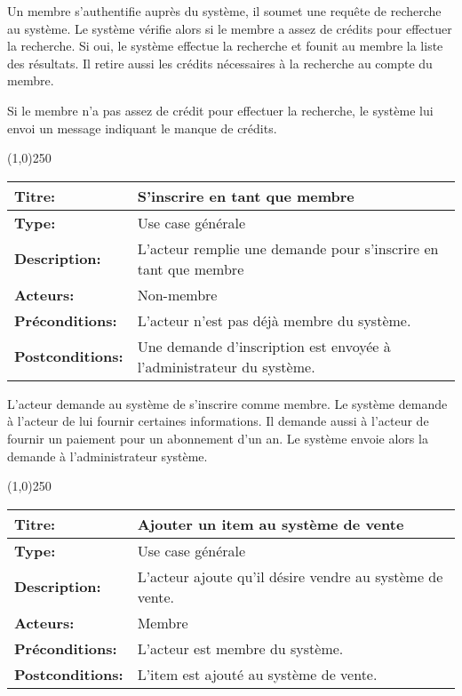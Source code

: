 \documentclass[letterpaper,11pt]{letter}
\begin{document}
Un membre s'authentifie auprès du système, il soumet une requête de recherche au système. Le système vérifie alors si le membre a assez de crédits pour effectuer
la recherche. Si oui, le système effectue la recherche et founit au membre la liste des résultats. Il retire aussi les crédits nécessaires à la recherche au compte
du membre.

Si le membre n'a pas assez de crédit pour effectuer la recherche, le système lui envoi un message indiquant le manque de crédits.

\begin{center}
\line(1,0){250}
\end{center}

\begin{tabular}{|l|p{}|}
  \hline
{\bf Titre:} & S'inscrire en tant que membre\\
  \hline
{\bf Type:} & Use case générale\\
\hline
{\bf Description:} & L'acteur remplie une demande pour s'inscrire en tant que membre\\
\hline
{\bf Acteurs:} & Non-membre\\
\hline
{\bf Préconditions:} & L'acteur n'est pas déjà membre du système.\\
\hline
{\bf Postconditions:} & Une demande d'inscription est envoyée à l'administrateur du système.\\
\hline
\end{tabular}

L'acteur demande au système de s'inscrire comme membre. Le système demande à l'acteur de lui fournir certaines informations. Il demande aussi à l'acteur 
de fournir un paiement pour un abonnement d'un an. Le système envoie alors la demande à l'administrateur système.

\begin{center}
\line(1,0){250}
\end{center}

\begin{tabular}{|l|p{}|}
  \hline
{\bf Titre:} & Ajouter un item au système de vente\\
  \hline
{\bf Type:} & Use case générale\\
\hline
{\bf Description:} & L'acteur ajoute qu'il désire vendre au système de vente.\\
\hline
{\bf Acteurs:} & Membre\\
\hline
{\bf Préconditions:} & L'acteur est membre du système.\\
\hline
{\bf Postconditions:} & L'item est ajouté au système de vente.\\
\hline
\end{tabular}
\end{document}
